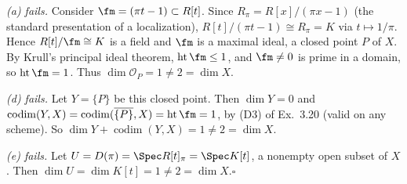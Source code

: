 \documentclass[11pt]{article}
\begin{document}
\emph{(a) fails.} Consider $\fm=(\pi t-1)\subset R[t]$. Since $R_\pi=R[x]/(\pi x-1)$ (the standard presentation of a localization), $R[t]/(\pi t-1)\cong R_\pi=K$ via $t\mapsto1/\pi$. Hence $R[t]/\fm\cong K$ is a field and $\fm$ is a maximal ideal, a closed point $P$ of $X$. By Krull's principal ideal theorem, $\operatorname{ht}\fm\le1$, and $\fm\ne0$ is prime in a domain, so $\operatorname{ht}\fm=1$. Thus $\dim\mathcal O_P=1\ne2=\dim X$.

\emph{(d) fails.} Let $Y=\{P\}$ be this closed point. Then $\dim Y=0$ and $\operatorname{codim}(Y,X)=\operatorname{codim}(\overline{\{P\}},X)=\operatorname{ht}\fm=1$, by (D3) of Ex.~3.20 (valid on any scheme). So $\dim Y+\operatorname{codim}(Y,X)=1\ne2=\dim X$.

\emph{(e) fails.} Let $U=D(\pi)=\Spec R[t]_\pi=\Spec K[t]$, a nonempty open subset of $X$. Then $\dim U=\dim K[t]=1\ne2=\dim X$.\hfill$\square$
\end{document}
